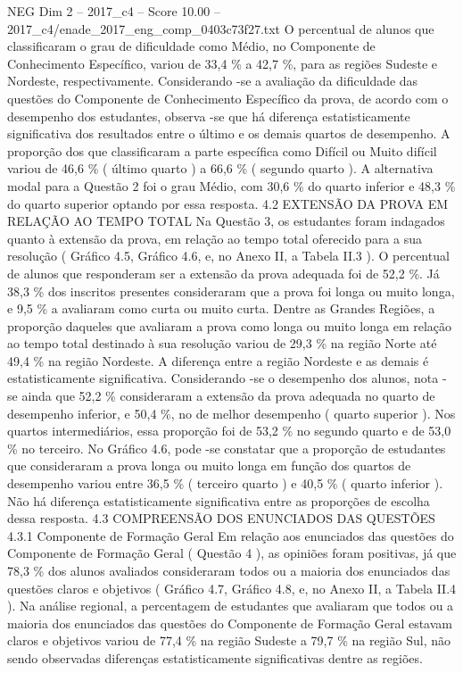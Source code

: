 \begin{textsample}{NEG Dim 2 – 2017\_c4 – Score 10.00 – 2017\_c4/enade\_2017\_eng\_comp\_0403c73f27.txt}
O percentual de alunos que classificaram o grau de dificuldade como Médio, no Componente de Conhecimento Específico, variou de 33,4 \% a 42,7 \%, para as regiões Sudeste e Nordeste, respectivamente.
Considerando -se a avaliação da dificuldade das questões do Componente de Conhecimento Específico da prova, de acordo com o desempenho dos estudantes, observa -se que há diferença estatisticamente significativa dos resultados entre o último e os demais quartos de desempenho.
A proporção dos que classificaram a parte específica como Difícil ou Muito difícil variou de 46,6 \% ( último quarto ) a 66,6 \% ( segundo quarto ).
A alternativa modal para a Questão 2 foi o grau Médio, com 30,6 \% do quarto inferior e 48,3 \% do quarto superior optando por essa resposta. 4.2 EXTENSÃO DA PROVA EM RELAÇÃO AO TEMPO TOTAL Na Questão 3, os estudantes foram indagados quanto à extensão da prova, em relação ao tempo total oferecido para a sua resolução ( Gráfico 4.5, Gráfico 4.6, e, no Anexo II, a Tabela II.3 ).
O percentual de alunos que responderam ser a extensão da prova adequada foi de 52,2 \%.
Já 38,3 \% dos inscritos presentes consideraram que a prova foi longa ou muito longa, e 9,5 \% a avaliaram como curta ou muito curta.
Dentre as Grandes Regiões, a proporção daqueles que avaliaram a prova como longa ou muito longa em relação ao tempo total destinado à sua resolução variou de 29,3 \% na região Norte até 49,4 \% na região Nordeste.
A diferença entre a região Nordeste e as demais é estatisticamente significativa.
Considerando -se o desempenho dos alunos, nota -se ainda que 52,2 \% consideraram a extensão da prova adequada no quarto de desempenho inferior, e 50,4 \%, no de melhor desempenho ( quarto superior ).
Nos quartos intermediários, essa proporção foi de 53,2 \% no segundo quarto e de 53,0 \% no terceiro.
No Gráfico 4.6, pode -se constatar que a proporção de estudantes que consideraram a prova longa ou muito longa em função dos quartos de desempenho variou entre 36,5 \% ( terceiro quarto ) e 40,5 \% ( quarto inferior ).
Não há diferença estatisticamente significativa entre as proporções de escolha dessa resposta. 4.3 COMPREENSÃO DOS ENUNCIADOS DAS QUESTÕES 4.3.1 Componente de Formação Geral Em relação aos enunciados das questões do Componente de Formação Geral ( Questão 4 ), as opiniões foram positivas, já que 78,3 \% dos alunos avaliados consideraram todos ou a maioria dos enunciados das questões claros e objetivos ( Gráfico 4.7, Gráfico 4.8, e, no Anexo II, a Tabela II.4 ).
Na análise regional, a percentagem de estudantes que avaliaram que todos ou a maioria dos enunciados das questões do Componente de Formação Geral estavam claros e objetivos variou de 77,4 \% na região Sudeste a 79,7 \% na região Sul, não sendo observadas diferenças estatisticamente significativas dentre as regiões.

\end{textsample}
